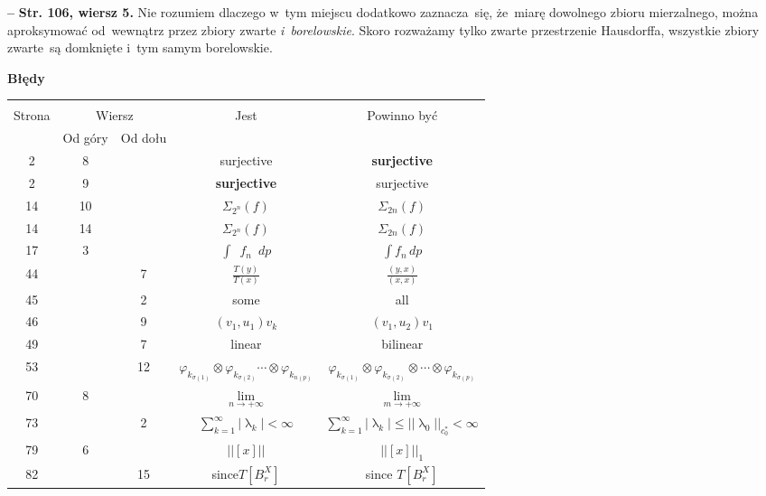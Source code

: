 \documentclass[a4paper,11pt]{article}
\newcommand{\fr}{\frac}
\newcommand{\ra}{\rightarrow}
\newcommand{\la}{\uplambda}
\newcommand{\vp}{\varphi}
\newcommand{\si}{\sigma}
\newcommand{\Si}{\Sigma}
\newcommand{\ot}{\otimes}
\newcommand{\Lim}{\lim\limits}
\newcommand{\Sum}{\sum\limits}
\newcommand{\Int}{\int\limits}
\newcommand{\IntCaD}[2] { \Int #1 \, d#2 } %
\providecommand{\absj}[1]{\lvert #1 \rvert}
\newcommand{\norm}[1]{\left|\left| #1 \right|\right|}
\newcommand{\tb}{\textbf}
\newcommand{\noi}{\noindent}
\newcommand{\start}{\noi \tb{--} {}}
\newcommand{\StrWg}[2]{\tb{Str. #1, wiersz #2.}}
\newcommand{\Center}[1]{\begin{center} #1 \end{center}}
\newcommand{\CenterTB}[1]{\Center{\tb{#1}}}
\begin{document}
\start \StrWg{106}{5} Nie rozumiem dlaczego w~tym miejscu dodatkowo
zaznacza~się, że~miarę dowolnego zbioru mierzalnego, można
aproksymować od~wewnątrz przez zbiory zwarte \emph{i~borelowskie}.
Skoro rozważamy tylko zwarte przestrzenie Hausdorffa, wszystkie zbiory
zwarte~są domknięte i~tym samym borelowskie.

\newpage



\CenterTB{Błędy}
\begin{center}
  \begin{tabular}{|c|c|c|c|c|}
    \hline
    & \multicolumn{2}{c|}{} & & \\
    Strona & \multicolumn{2}{c|}{Wiersz}& Jest & Powinno być \\ \cline{2-3}
    & Od góry & Od dołu &  &  \\ \hline
    2 & 8 & & surjective & \tb{surjective} \\
    2 & 9 & & \tb{surjective} & surjective \\
    14 & 10 & & $\Si_{ 2^{ n } }( f )$ & $\Si_{ 2 n }( f )$ \\
    14 & 14 & & $\Si_{ 2^{ n } }( f )$ & $\Si_{ 2 n }( f )$ \\
    17 & 3 & & $\int \;\: f_{ n } \;\: dp$ & $\IntCaD{ f_{ n } }{ p }$ \\
    44 & & 7 & $\fr{ T( y ) }{ T( x ) }$ & $\fr{ ( y, x ) }{ ( x, x ) }$ \\
    45 & & 2 & some & all \\
    46 & & 9 & $(v_{ 1 }, u_{ 1 } ) v_{ k }$ & $(v_{ 1 }, u_{ 2 } )
                                               v_{ 1 }$ \\
    49 & & 7 & linear & bilinear \\
    53 & & 12 & $\vp_{ k_{ \si( 1 ) } } \ot \vp_{ k_{ \si( 2 ) } } \cdots
                \ot \vp_{ k_{ n( p ) } }$
           & $\vp_{ k_{ \si( 1 ) } } \ot \vp_{ k_{ \si( 2 ) } } \ot \cdots
             \ot \vp_{ k_{ \si( p ) } }$ \\
    70 & 8 & & $\Lim_{ n \ra +\infty }$ & $\Lim_{ m \ra +\infty }$ \\ %
    73 & & 2 & $\Sum_{ k = 1 }^{ \infty } \absj{ \la_{ k } } < \infty$
           & $\Sum_{ k = 1 }^{ \infty } \absj{ \la_{ k } } \leq
             \norm{ \la_{ 0 } }_{ c_{ 0 }^{ * } } < \infty$ \\
    79 & 6 & & $\norm{ [x] }$ & $\norm{ [x] }_{ 1 }$ \\
    82 & & 15 & since$T[ B_{ r }^{ X } ]$ & since $T[ B_{ r }^{ X } ]$ \\

\end{tabular}
\end{center}
\end{document}
